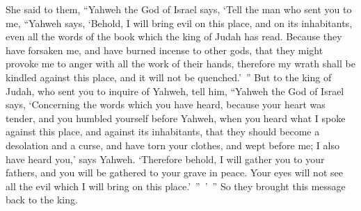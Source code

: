 {She said to them, “Yahweh the God of Israel says, ‘Tell the man who sent you to me,
“Yahweh says, ‘Behold, I will bring evil on this place, and on its inhabitants, even all the words of the book which the king of Judah has read.
Because they have forsaken me, and have burned incense to other gods, that they might provoke me to anger with all the work of their hands, therefore my wrath shall be kindled against this place, and it will not be quenched.’ ”
But to the king of Judah, who sent you to inquire of Yahweh, tell him, “Yahweh the God of Israel says, ‘Concerning the words which you have heard,
because your heart was tender, and you humbled yourself before Yahweh, when you heard what I spoke against this place, and against its inhabitants, that they should become a desolation and a curse, and have torn your clothes, and wept before me; I also have heard you,’ says Yahweh.
‘Therefore behold, I will gather you to your fathers, and you will be gathered to your grave in peace. Your eyes will not see all the evil which I will bring on this place.’ ” ’ ” So they brought this message back to the king.

}
